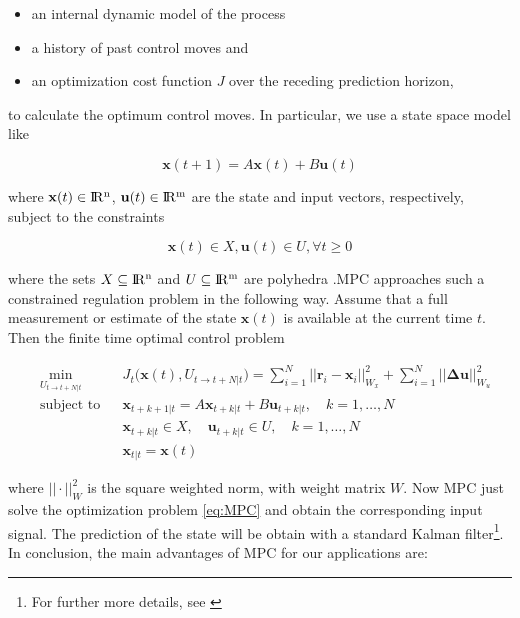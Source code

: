 \begin{itemize}
	\item an internal dynamic model of the process
	\item a history of past control moves and
	\item an optimization cost function $J$ over the receding prediction horizon,
\end{itemize}

\noindent to calculate the optimum control moves. In particular, we use a state space model like

\begin{equation}
	\mathbf{x}(t+1) = A\mathbf{x}(t) + B\mathbf{u}(t)
\end{equation}

\noindent where $\mathbf{x}(t) \in \rm I\!R^n$, $\mathbf{u}(t) \in \rm I\!R^m$ are the state and input vectors, respectively, subject to the constraints 

\begin{equation}
	\mathbf{x}(t) \in X, \mathbf{u}(t) \in U, \forall t \ge 0
\end{equation}  

\noindent where the sets $X \subseteq \rm I\!R^n$ and $U \subseteq \rm I\!R^m$ are polyhedra \cite{MPC}.MPC approaches such a constrained regulation problem in the following way. Assume that a full measurement or estimate of the state $\mathbf{x}(t)$ is available at the current time $t$. Then the finite time optimal control problem

\begin{align}
	&\min_{U_{t\to t+N|t}} &&J_t\big(\mathbf{x}(t), U_{t\to t+N|t}\big)=\sum_{i=1}^N||\mathbf{r}_i-\mathbf{x}_i||^2_{W_x} + \sum_{i=1}^N||\boldsymbol{\Delta}\mathbf{u}||^2_{W_u} \label{eq:MPC} \\
	&\text{subject to} &&\mathbf{x}_{t+k+1|t}=A\mathbf{x}_{t+k|t}+B\mathbf{u}_{t+k|t}, \quad k=1,\dots,N \nonumber \\
	& &&\mathbf{x}_{t+k|t} \in X, \quad \mathbf{u}_{t+k|t} \in U, \quad k=1,\dots,N \nonumber \\
	& &&\mathbf{x}_{t|t}=\mathbf{x}(t) \nonumber
\end{align}

\noindent where $||\cdot||^2_{W}$ is the square weighted norm, with weight matrix $W$. Now MPC just solve the optimization problem \eqref{eq:MPC} and obtain the corresponding input signal. The prediction of the state will be obtain with a standard Kalman filter\footnote{For further more details, see \cite{MPC}}. In conclusion, the main advantages of MPC for our applications are:

